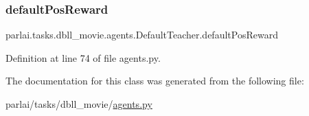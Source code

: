 \subsubsection{\texorpdfstring{default\+Pos\+Reward}{defaultPosReward}}
{\footnotesize\ttfamily parlai.\+tasks.\+dbll\+\_\+movie.\+agents.\+Default\+Teacher.\+default\+Pos\+Reward}



Definition at line 74 of file agents.\+py.



The documentation for this class was generated from the following file\+:\begin{DoxyCompactItemize}
\item 
parlai/tasks/dbll\+\_\+movie/\hyperlink{parlai_2tasks_2dbll__movie_2agents_8py}{agents.\+py}\end{DoxyCompactItemize}
